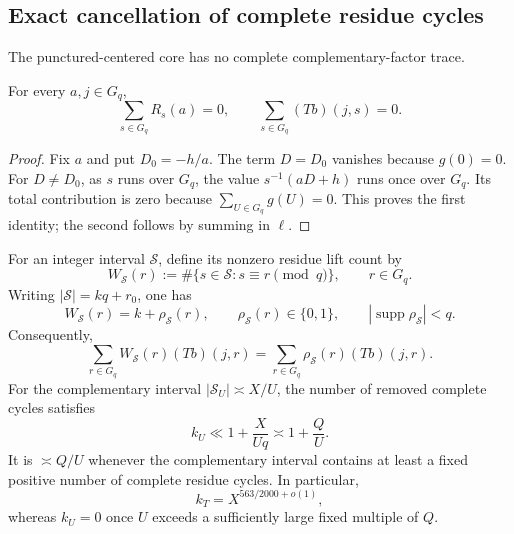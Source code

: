 \subsection{Exact cancellation of complete residue cycles}

The punctured-centered core has no complete complementary-factor trace.

\begin{proposition}
\label{prop:tpc37-complete-cycle-annihilation}
For every \(a,j\in G_q\),
\begin{equation}
 \sum_{s\in G_q}R_s(a)=0,
 \qquad
 \sum_{s\in G_q}(Tb)(j,s)=0.
 \label{eq:tpc37-complete-cycle-annihilation}
\end{equation}
\end{proposition}

\begin{proof}
Fix \(a\) and put \(D_0=-h/a\).  The term \(D=D_0\) vanishes because
\(g(0)=0\).  For \(D\ne D_0\), as \(s\) runs over \(G_q\), the value
\(s^{-1}(aD+h)\) runs once over \(G_q\).  Its total contribution is zero
because \(\sum_{U\in G_q}g(U)=0\).  This proves the first identity; the
second follows by summing in \(\ell\).
\end{proof}

For an integer interval \(\mathcal S\), define its nonzero residue lift
count by
\begin{equation}
 W_{\mathcal S}(r)
 :=\#\{s\in\mathcal S:s\equiv r\pmod q\},
 \qquad r\in G_q.
 \label{eq:tpc37-s-lift-count}
\end{equation}
Writing \(|\mathcal S|=kq+r_0\), one has
\begin{equation}
 W_{\mathcal S}(r)=k+\rho_{\mathcal S}(r),
 \qquad
 \rho_{\mathcal S}(r)\in\{0,1\},
 \qquad
 |\operatorname{supp}\rho_{\mathcal S}|<q.
 \label{eq:tpc37-cycle-boundary-decomposition}
\end{equation}
Consequently,
\begin{equation}
 \sum_{r\in G_q}W_{\mathcal S}(r)(Tb)(j,r)
 =\sum_{r\in G_q}\rho_{\mathcal S}(r)(Tb)(j,r).
 \label{eq:tpc37-complete-cycles-removed}
\end{equation}
For the complementary interval \(|\mathcal S_U|\asymp X/U\), the number
of removed complete cycles satisfies
\begin{equation}
 k_U\ll1+\frac X{Uq}\asymp1+\frac Q U.
 \label{eq:tpc37-complete-cycle-count}
\end{equation}
It is \(\asymp Q/U\) whenever the complementary interval contains at
least a fixed positive number of complete residue cycles.  In particular,
\begin{equation}
 k_T=X^{563/2000+o(1)},
 \label{eq:tpc37-low-ultra-cycle-count}
\end{equation}
whereas \(k_U=0\) once \(U\) exceeds a sufficiently large fixed multiple
of \(Q\).

